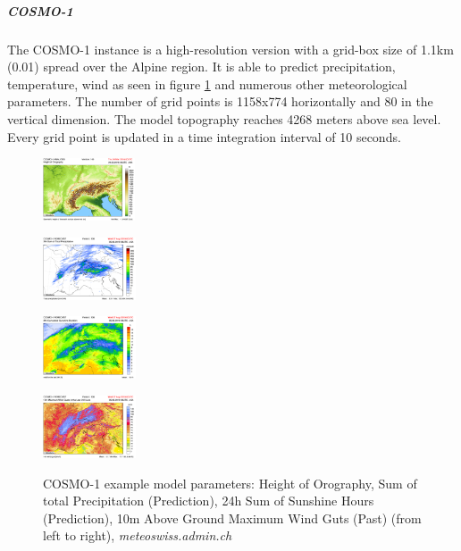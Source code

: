 \subparagraph{COSMO-1}
The COSMO-1 instance is a high-resolution version with a grid-box size of 1.1km (0.01\degree) spread over the Alpine region. It is able to predict precipitation, temperature, wind as seen in figure \ref{fig:cosmo-1} and numerous other meteorological parameters. The number of grid points is 1158x774 horizontally and 80 in the vertical dimension. The model topography reaches 4268 meters above sea level. Every grid point is updated in a time integration interval of 10 seconds.
\begin{figure}[h]
	\begin{minipage}{.24\columnwidth}
		\centering
		\includegraphics[height=5em]{images/cosmo-1-general.png}
		\label{fig:cosmo-1-general}
	\end{minipage}
	\begin{minipage}{.24\columnwidth}
		\centering
		\includegraphics[height=5em]{images/cosmo-1-precipitation.png}
		\label{fig:cosmo-1-precipitation}
	\end{minipage}
	\begin{minipage}{.24\columnwidth}
		\centering
		\includegraphics[height=5em]{images/cosmo-1-sunshine-duration.png}
		\label{fig:cosmo-1-sunshine-duration}
	\end{minipage}
	\begin{minipage}{.24\columnwidth}
		\centering
		\includegraphics[height=5em]{images/cosmo-1-10m-max-wind-guts.png}
		\label{fig:cosmo-1-10m-max-wind-guts}
	\end{minipage}
	\caption{COSMO-1 example model parameters: Height of Orography, Sum of total Precipitation (Prediction), 24h Sum of Sunshine Hours (Prediction), 10m Above Ground Maximum Wind Guts (Past) (from left to right), \textit{meteoswiss.admin.ch}}
	\label{fig:cosmo-1}
\end{figure}


